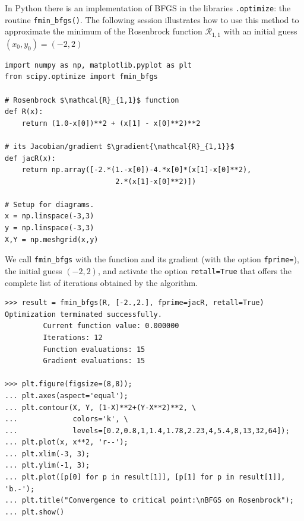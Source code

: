 \begin{example}
In Python there is an implementation of BFGS in the libraries \scipy\texttt{.optimize}: the routine \texttt{fmin\_bfgs()}.  The following session illustrates how to use this method to approximate the minimum of the Rosenbrock function $\mathcal{R}_{1,1}$  with an initial guess $(x_0, y_0)=(-2,2)$

\begin{verbatim}
import numpy as np, matplotlib.pyplot as plt 
from scipy.optimize import fmin_bfgs

# Rosenbrock $\mathcal{R}_{1,1}$ function
def R(x): 
	return (1.0-x[0])**2 + (x[1] - x[0]**2)**2

# its Jacobian/gradient $\gradient{\mathcal{R}_{1,1}}$
def jacR(x): 
	return np.array([-2.*(1.-x[0])-4.*x[0]*(x[1]-x[0]**2), 
                          2.*(x[1]-x[0]**2)])

# Setup for diagrams. 
x = np.linspace(-3,3)
y = np.linspace(-3,3)
X,Y = np.meshgrid(x,y)
\end{verbatim}

We call \texttt{fmin\_bfgs} with the function and its gradient (with the option \texttt{fprime=}), the initial guess $(-2,2)$, and activate the option \texttt{retall=True} that offers the complete list of iterations obtained by the algorithm.


\begin{verbatim}
>>> result = fmin_bfgs(R, [-2.,2.], fprime=jacR, retall=True)
Optimization terminated successfully.
         Current function value: 0.000000
         Iterations: 12
         Function evaluations: 15
         Gradient evaluations: 15

>>> plt.figure(figsize=(8,8));
... plt.axes(aspect='equal');
... plt.contour(X, Y, (1-X)**2+(Y-X**2)**2, \
...             colors='k', \
...             levels=[0.2,0.8,1,1.4,1.78,2.23,4,5.4,8,13,32,64]);
... plt.plot(x, x**2, 'r--');
... plt.xlim(-3, 3);
... plt.ylim(-1, 3);
... plt.plot([p[0] for p in result[1]], [p[1] for p in result[1]], 'b.-');
... plt.title("Convergence to critical point:\nBFGS on Rosenbrock");
... plt.show()
\end{verbatim}


\end{example}
